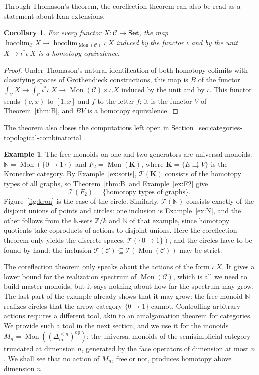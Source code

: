 \documentclass[11pt]{amsart}
\newtheorem{corollary}[teo]{Corollary}
\theoremstyle{definition}
\newtheorem{example}[teo]{Example}
\theoremstyle{remark}
\numberwithin{figure}{section}%
\newcommand{\CC}{\mathcal{C}}
\DeclareMathOperator{\Mon}{Mon}
\DeclareMathOperator{\hocolim}{hocolim}
\newcommand{\C}{\mathcal{C}}
\newcommand{\T}{\mathcal{T}}
\newcommand{\Set}{\mathbf{Set}}
\newcommand{\Dinj}{\Delta_{\mathrm{inj}}}
\newcommand{\op}{\mathrm{op}}
\begin{document}
Through Thomason's theorem, the coreflection theorem can also be read as a statement about Kan extensions.

\begin{corollary}\label{cor:kan}
For every functor $X\colon\C\to\Set$, the map $\hocolim_\C X\to\hocolim_{\Mon(\C)}\iota_!X$ induced by the functor $\iota$ and by the unit $X\to\iota^*\iota_!X$ is a homotopy equivalence.
\end{corollary}

\begin{proof}
Under Thomason's natural identification of both homotopy colimits with classifying spaces of Grothendieck constructions, this map is $B$ of the functor $\int_\C X\to\int_\C\iota^*\iota_!X\to\Mon(\C)\ltimes\iota_!X$ induced by the unit and by $\iota$. This functor sends $(c,x)$ to $[1,x]$ and $f$ to the letter $f$; it is the functor $V$ of Theorem~\ref{thm:B}, and $BV$ is a homotopy equivalence.
\end{proof}

The theorem also closes the computations left open in Section~\ref{sec:categories-topological-combinatorial}.

\begin{example}\label{ex:spectra}
The free monoids on one and two generators are universal monoids: $\mathbb N=\Mon(\{0\to1\})$ and $F_2=\Mon(\mathbf K)$, where $\mathbf K=\{E\rightrightarrows V\}$ is the Kronecker category. By Example~\ref{ex:sorts}, $\T(\mathbf K)$ consists of the homotopy types of all graphs, so Theorem~\ref{thm:B} and Example~\ref{ex:F2} give
\[
\T(F_2)=\{\text{homotopy types of graphs}\}.
\]
Figure~\ref{fig:kron} is the case of the circle. Similarly, $\T(\mathbb N)$ consists exactly of the disjoint unions of points and circles: one inclusion is Example~\ref{ex:N}, and the other follows from the $\mathbb N$-sets $\mathbb Z/k$ and $\mathbb N$ of that example, since homotopy quotients take coproducts of actions to disjoint unions. Here the coreflection theorem only yields the discrete spaces, $\T(\{0\to1\})$, and the circles have to be found by hand: the inclusion $\T(\CC)\subseteq\T(\Mon(\CC))$ may be strict.
\end{example}

The coreflection theorem only speaks about the actions of the form $\iota_!X$. It gives a lower bound for the realization spectrum of $\Mon(\CC)$, which is all we need to build master monoids, but it says nothing about how far the spectrum may grow. The last part of the example already shows that it may grow: the free monoid $\mathbb N$ realizes circles that the arrow category $\{0\to1\}$ cannot. Controlling arbitrary actions requires a different tool, akin to an amalgamation theorem for categories. We provide such a tool in the next section, and we use it for the monoids $M_n=\Mon((\Dinj^{\leq n})^{\op})$: the universal monoids of the semisimplicial category truncated at dimension $n$, generated by the face operators of dimension at most $n$. We shall see that no action of $M_n$, free or not, produces homotopy above dimension $n$.
\end{document}
